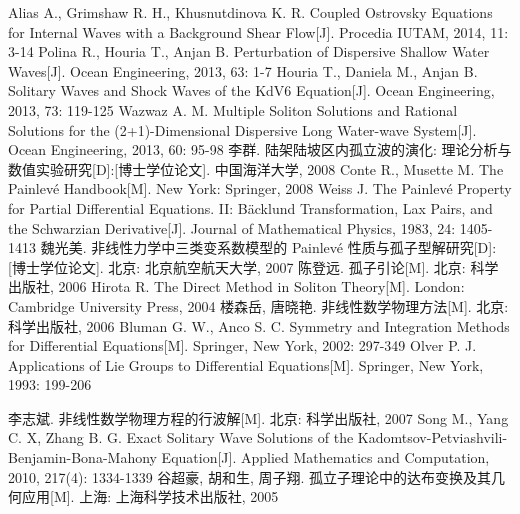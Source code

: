 \begin{thebibliography}{0}
 Alias A., Grimshaw R. H., Khusnutdinova K. R. Coupled Ostrovsky Equations for Internal Waves with a Background Shear Flow[J]. Procedia IUTAM, 2014, 11: 3-14
 Polina R., Houria T., Anjan B.  Perturbation of Dispersive Shallow Water Waves[J]. Ocean Engineering, 2013, 63: 1-7
Houria T., Daniela M., Anjan B. Solitary Waves and Shock Waves of the KdV6 Equation[J]. Ocean Engineering, 2013, 73: 119-125
 Wazwaz A. M. Multiple Soliton Solutions and Rational Solutions for the (2+1)-Dimensional Dispersive Long Water-wave System[J]. Ocean Engineering, 2013, 60: 95-98
 李群. 陆架陆坡区内孤立波的演化: 理论分析与数值实验研究[D]:[博士学位论文]. 中国海洋大学, 2008
 Conte R., Musette M. The Painlev\'{e} Handbook[M]. New York: Springer, 2008
 Weiss J. The Painlev\'{e} Property for Partial Differential Equations. II: B\"{a}cklund Transformation, Lax Pairs, and the Schwarzian Derivative[J]. Journal of Mathematical Physics, 1983, 24: 1405-1413
 魏光美. 非线性力学中三类变系数模型的 Painlev\'{e} 性质与孤子型解研究[D]:[博士学位论文]. 北京: 北京航空航天大学, 2007
 陈登远. 孤子引论[M]. 北京: 科学出版社, 2006
 Hirota R. The Direct Method in Soliton Theory[M]. London: Cambridge University Press, 2004%
 楼森岳, 唐晓艳. 非线性数学物理方法[M]. 北京: 科学出版社, 2006
 Bluman G. W., Anco S. C. Symmetry and Integration Methods for Differential Equations[M]. Springer, New York, 2002: 297-349
 Olver P. J. Applications of Lie Groups to Differential Equations[M]. Springer, New York, 1993: 199-206

 李志斌. 非线性数学物理方程的行波解[M]. 北京: 科学出版社, 2007
 Song M., Yang C. X, Zhang B. G. Exact Solitary Wave Solutions of the  Kadomtsov-Petviashvili-Benjamin-Bona-Mahony Equation[J]. Applied Mathematics and Computation, 2010, 217(4): 1334-1339
 谷超豪, 胡和生, 周子翔. 孤立子理论中的达布变换及其几何应用[M]. 上海: 上海科学技术出版社, 2005



\end{thebibliography}

